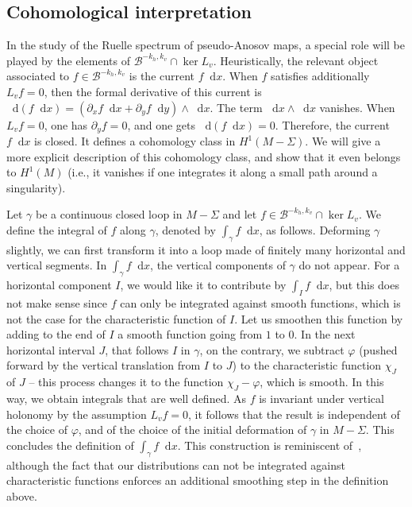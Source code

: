 \documentclass[11pt, a4paper, oneside, final, pagebackref]{amsart}
\newcommand{\boB}{\mathcal{B}}
\newcommand{\dd}{\mathop{}\!\mathrm{d}}
\renewcommand{\phi}{\varphi}
\theoremstyle{definition}
\numberwithin{equation}{section}
\begin{document}
\subsection{Cohomological interpretation}
\label{subsec:cohomological}

In the study of the Ruelle spectrum of pseudo-Anosov maps, a special role
will be played by the elements of $\boB^{-k_h, k_v} \cap \ker L_v$.
Heuristically, the relevant object associated to $f \in \boB^{-k_h, k_v}$ is
the current $f \dd x$. When $f$ satisfies additionally $L_v f = 0$, then the
formal derivative of this current is $\dd (f \dd x)=(\partial_x f \dd x +
\partial_y f \dd y) \wedge \dd x$. The term $\dd x \wedge \dd x$ vanishes.
When $L_v f = 0$, one has $\partial_y f = 0$, and one gets $\dd (f \dd x)=0$.
Therefore, the current $f \dd x$ is closed. It defines a cohomology class in
$H^1(M-\Sigma)$. We will give a more explicit description of this cohomology
class, and show that it even belongs to $H^1(M)$ (i.e., it vanishes if one
integrates it along a small path around a singularity).

Let $\gamma$ be a continuous closed loop in $M-\Sigma$ and let $f \in
\boB^{-k_h, k_v} \cap \ker L_v$. We define the integral of $f$ along
$\gamma$, denoted by $\int_\gamma f \dd x$, as follows. Deforming $\gamma$
slightly, we can first transform it into a loop made of finitely many
horizontal and vertical segments. In $\int_\gamma f \dd x$, the vertical
components of $\gamma$ do not appear. For a horizontal component $I$, we
would like it to contribute by $\int_I f \dd x$, but this does not make sense
since $f$ can only be integrated against smooth functions, which is not the
case for the characteristic function of $I$. Let us smoothen this function by
adding to the end of $I$ a smooth function going from $1$ to $0$. In the next
horizontal interval $J$, that follows $I$ in $\gamma$, on the contrary, we
subtract $\phi$ (pushed forward by the vertical translation from $I$ to $J$)
to the characteristic function $\chi_J$ of $J$ -- this process changes it to
the function $\chi_J - \phi$, which is smooth. In this way, we obtain
integrals that are well defined. As $f$ is invariant under vertical holonomy
by the assumption $L_v f = 0$, it follows that the result is independent of
the choice of $\phi$, and of the choice of the initial deformation of
$\gamma$ in $M-\Sigma$. This concludes the definition of $\int_\gamma f \dd
x$. This construction is reminiscent
of~\cite[Paragraph~1.3]{bufetov_translation_flow}, although the fact that our
distributions can not be integrated against characteristic functions enforces
an additional smoothing step in the definition above.
\end{document}
